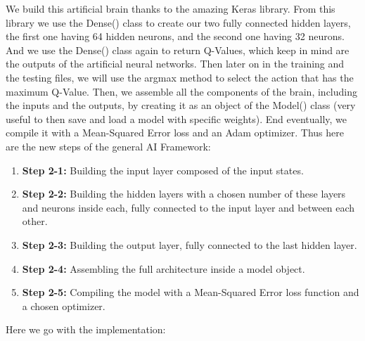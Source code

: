 \documentclass[]{book}
\begin{document}
We build this artificial brain thanks to the amazing Keras library. From this library we use the Dense() class to create our two fully connected hidden layers, the first one having 64 hidden neurons, and the second one having 32 neurons. And we use the Dense() class again to return Q-Values, which keep in mind are the outputs of the artificial neural networks. Then later on in the training and the testing files, we will use the argmax method to select the action that has the maximum Q-Value. Then, we assemble all the components of the brain, including the inputs and the outputs, by creating it as an object of the Model() class (very useful to then save and load a model with specific weights). End eventually, we compile it with a Mean-Squared Error loss and an Adam optimizer. Thus here are the new steps of the general AI Framework:

\begin{enumerate}
    \item \textbf{Step 2-1:} Building the input layer composed of the input states.
    \item \textbf{Step 2-2:} Building the hidden layers with a chosen number of these layers and neurons inside each, fully connected to the input layer and between each other.
    \item \textbf{Step 2-3:} Building the output layer, fully connected to the last hidden layer.
    \item \textbf{Step 2-4:} Assembling the full architecture inside a model object.
    \item \textbf{Step 2-5:} Compiling the model with a Mean-Squared Error loss function and a chosen optimizer.
\end{enumerate}

Here we go with the implementation:
\end{document}

